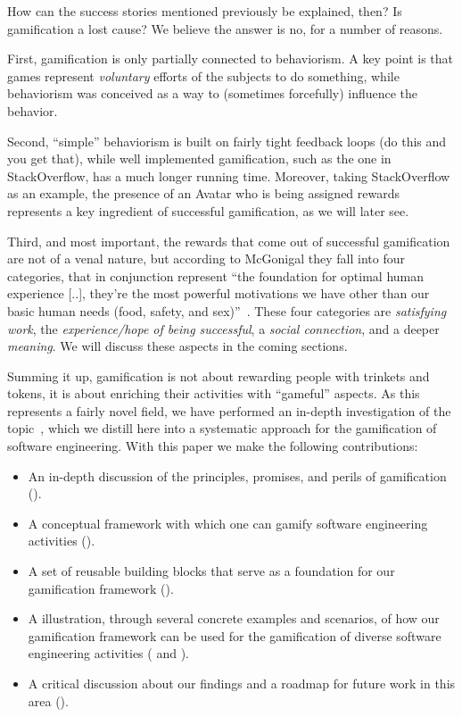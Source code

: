 How can the success stories mentioned previously be explained, then? Is gamification a lost cause? We believe the answer is no, for a number of reasons.

First, gamification is only partially connected to behaviorism. A key point is that games represent \emph{voluntary} efforts of the subjects to do something, while behaviorism was conceived as a way to (sometimes forcefully) influence the behavior.

Second, ``simple'' behaviorism is built on fairly tight feedback loops (do this and you get that), while well implemented gamification, such as the one in StackOverflow, has a much longer running time. Moreover, taking StackOverflow as an example, the presence of an Avatar who is being assigned rewards represents a key ingredient of successful gamification, as we will later see. 

Third, and most important, the rewards that come out of successful gamification are not of a venal nature, but according to McGonigal they fall into four categories, that in conjunction represent ``the foundation for optimal human experience [..], they're the most powerful motivations we have other than our basic human needs (food, safety, and sex)''~\cite{McGo2011a}. These four categories are \emph{satisfying work}, the \emph{experience/hope of being successful}, a \emph{social connection}, and a deeper \emph{meaning}. We will discuss these aspects in the coming sections.

Summing it up, gamification is not about rewarding people with trinkets and tokens, it is about enriching their activities with ``gameful'' aspects. As this represents a fairly novel field, we have performed an in-depth investigation of the topic~\cite{Mast2014a}, which we distill here into a systematic approach for the gamification of software engineering. With this paper we make the following contributions:

\begin{itemize}

\item An in-depth discussion of the principles, promises, and perils of gamification ().

\item A conceptual framework with which one can gamify software engineering activities ().

\item A set of reusable building blocks that serve as a foundation for our gamification framework ().

\item A illustration, through several concrete examples and scenarios, of how our gamification framework can be used for the gamification of diverse software engineering activities ( and ).

\item A critical discussion about our findings and a roadmap for future work in this area ().

\end{itemize}


